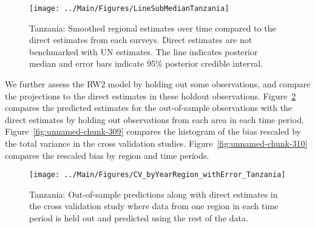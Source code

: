 \documentclass[12pt]{article}\usepackage[]{graphicx}\usepackage[]{color}
\newenvironment{knitrout}{}{} %
\begin{document}
\begin{knitrout}
\color{fgcolor}\begin{figure}[bht]

{\centering \texttt{[image: ../Main/Figures/LineSubMedianTanzania]} 

}

\caption[Tanzania]{Tanzania: Smoothed regional estimates over time compared to the direct estimates from each surveys. Direct estimates are not benchmarked with UN estimates. The line indicates posterior median and error bars indicate 95\% posterior credible interval.}\label{fig:unnamed-chunk-307}
\end{figure}


\end{knitrout}
We further assess the RW2 model by holding out some observations, and compare the projections to the direct estimates in these holdout observations. Figure~\ref{fig:unnamed-chunk-308} compares the predicted estimates for the out-of-sample observations  with the direct estimates by holding out observations from each area in each time period.  Figure~\ref{fig:unnamed-chunk-309} compares the histogram of the bias rescaled by the total variance in the cross validation studies. Figure~\ref{fig:unnamed-chunk-310} compares the rescaled bias by region and time periods.



 
\begin{knitrout}
\color{fgcolor}\begin{figure}[bht]

{\centering \texttt{[image: ../Main/Figures/CV\_byYearRegion\_withError\_Tanzania]} 

}

\caption[Tanzania]{Tanzania: Out-of-sample predictions along with direct estimates in the cross validation study where data from one region in each time period is held out and predicted using the rest of the data.}\label{fig:unnamed-chunk-308}
\end{figure}


\end{knitrout}
\end{document}

